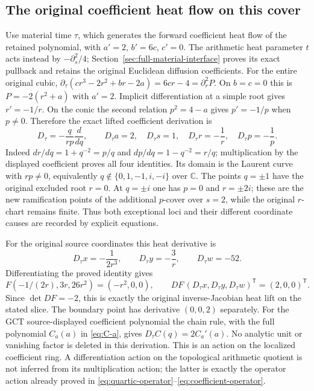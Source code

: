 \subsection{The original coefficient heat flow on this cover}
Use material time $\tau$, which generates the forward coefficient heat
flow of the retained polynomial, with $a'=2$, $b'=6c$, $c'=0$.
The arithmetic heat parameter $t$ acts instead by $-\partial_s^2/4$;
Section~\ref{sec:full-material-interface} proves its exact pullback and
retains the original Euclidean diffusion coefficients.
For the entire original cubic,
$\partial_\tau(cr^3-2r^2+br-2a)=6cr-4=\partial_r^2P$.
On $b=c=0$ this is $P=-2(r^2+a)$ with $a'=2$.
Implicit differentiation at a simple root gives $r'=-1/r$.
On the conic the second relation $p^2=4-a$ gives $p'=-1/p$
when $p\ne0$. Therefore the exact lifted coefficient derivation is
\[
 D_\tau=-\frac{q}{rp}\frac{d}{dq},\qquad
 D_\tau a=2,\quad D_\tau s=1,\quad
 D_\tau r=-\frac1r,\quad D_\tau p=-\frac1p.
\]
Indeed $dr/dq=1+q^{-2}=p/q$ and $dp/dq=1-q^{-2}=r/q$;
multiplication by the displayed coefficient proves all four identities.
Its domain is the Laurent curve with $rp\ne0$, equivalently
$q\notin\{0,1,-1,i,-i\}$ over $\mathbb C$.
The points $q=\pm1$ have the original excluded root $r=0$.
At $q=\pm i$ one has $p=0$ and $r=\pm2i$; these are the new
ramification points of the additional $p$-cover over $s=2$,
while the original $r$-chart remains finite.
Thus both exceptional loci and their different coordinate causes
are recorded by explicit equations.

For the original source coordinates this heat derivative is
\[
 D_\tau x=-\frac1{2r^3},\qquad
 D_\tau y=-\frac3r,\qquad
 D_\tau w=-52.
\]
Differentiating the proved identity gives
\[
 F(-1/(2r),3r,26r^2)=(-r^2,0,0),\qquad
 DF\,(D_\tau x,D_\tau y,D_\tau w)^{\mathsf T}=(2,0,0)^{\mathsf T}.
\]
Since $\det DF=-2$, this is exactly the original inverse-Jacobian
heat lift on the stated slice. The boundary point has derivative
$(0,0,2)$ separately.
For the GCT source-displayed coefficient polynomial the chain rule, with the full
polynomial $C_a(a)$ in \eqref{eq:C-a}, gives
$D_\tau C(q)=2C_a'(a)$. No analytic unit or vanishing factor is
deleted in this derivation. This is an action on the localized
coefficient ring. A differentiation action on the topological
arithmetic quotient is not inferred from its multiplication action;
the latter is exactly the operator action already proved in
\eqref{eq:quartic-operator}--\eqref{eq:coefficient-operator}.

